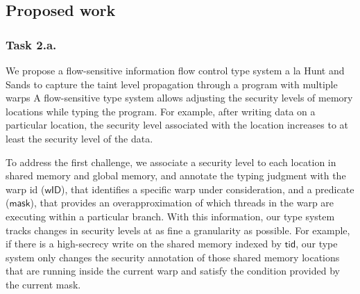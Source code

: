 \subsection{Proposed work}
\subsubsection{Task 2.a.} 
%
We propose a flow-sensitive information flow control type system a la Hunt and Sands\cite{hunt2006popl}  to capture the taint level propagation through a program with multiple warps
%
A flow-sensitive type system allows adjusting the security levels of memory locations while typing the program.
%
For example, after writing data on a particular location, the security level associated with the location increases to at least the security level of the data.
%

To address the first challenge, we associate a security level to each location in shared memory and global memory, and annotate the typing judgment with the warp id ($\mathsf{wID}$), that identifies a specific warp under consideration, and a predicate ($\mathsf{mask}$), that provides an overapproximation of which threads in the warp are executing within a particular branch. 
% 
With this information, our type system tracks changes in security levels at as fine a granularity  as possible.
For example, if there is a high-secrecy write on the shared memory indexed by $\mathsf{tid}$, our type system only changes the security annotation of those shared memory locations that are running inside the current warp and satisfy the condition provided by the current mask.


